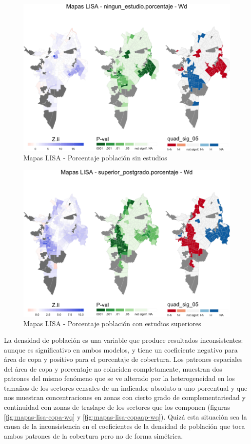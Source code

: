 \documentclass[12pt,]{book}
\begin{document}
\begin{figure}
\includegraphics[width=1\linewidth]{tesis-unigis_files/figure-latex/lisa-sinestudio-1} \caption{Mapas LISA - Porcentaje población sin estudios}\label{fig:lisa-sinestudio}
\end{figure}\begin{figure}
\includegraphics[width=1\linewidth]{tesis-unigis_files/figure-latex/lisa-superiores-1} \caption{Mapas LISA - Porcentaje población con estudios superiores}\label{fig:lisa-superiores}
\end{figure}

La densidad de población es una variable que produce resultados
inconsistentes: aunque es significativo en ambos modelos, y tiene un
coeficiente negativo para área de copa y positivo para el porcentaje de
cobertura. Los patrones espaciales del área de copa y porcentaje no
coinciden completamente, muestran dos patrones del mismo fenómeno que se
ve alterado por la heterogeneidad en los tamaños de los sectores
censales de un indicador absoluto a uno porcentual y que nos muestran
concentraciones en zonas con cierto grado de complementariedad y
continuidad con zonas de traslape de los sectores que los componen
(figuras \ref{fig:mapas-lisa-copa-wq} y \ref{fig:mapas-lisa-copaap-wq}).
Quizá esta situación sea la causa de la inconsistencia en el
coeficientes de la densidad de población que toca ambos patrones de la
cobertura pero no de forma simétrica.
\end{document}
